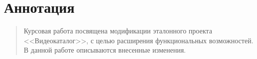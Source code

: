 \setcounter{page}{2}

\vspace*{1cm}
\section*{Аннотация}
\begin{quote} 
Курсовая работа посвящена модификации эталонного проекта <<Видеокаталог>>, с целью расширения функциональных возможностей. В данной работе описываются внесенные изменения.
{\em
}
\end{quote}

\tableofcontents*

\endinput
